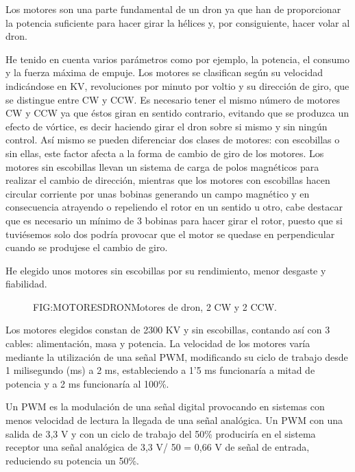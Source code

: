 
Los motores son una parte fundamental de un dron ya que han de proporcionar la potencia suficiente para hacer girar la hélices y, por consiguiente, hacer volar al dron. 
                
 He tenido en cuenta varios parámetros como por ejemplo, la potencia, el consumo y la fuerza máxima de empuje. 
 Los motores se clasifican según su velocidad indicándose en KV, revoluciones por minuto por voltio y su dirección de giro, que se distingue entre CW y CCW. Es necesario tener el mismo número de motores CW y CCW ya que éstos giran en sentido contrario, evitando que se produzca un efecto de vórtice, es decir haciendo girar el dron sobre si mismo y sin ningún control. \linebreak Así mismo se pueden diferenciar dos clases de motores: con escobillas o sin ellas, este factor afecta a la forma de cambio de giro de los motores. Los motores sin escobillas llevan un sistema de carga de polos magnéticos para realizar el cambio de dirección, mientras que los motores con escobillas hacen circular corriente por unas bobinas generando un campo magnético y en consecuencia atrayendo o repeliendo el rotor en un sentido u otro, cabe destacar que es necesario un mínimo de 3 bobinas para hacer girar el rotor, puesto que si tuviésemos solo dos podría provocar que el motor se quedase en perpendicular cuando se produjese el cambio de giro.

 He elegido unos motores sin escobillas por su rendimiento, menor desgaste y fiabilidad. 
 
 \begin{figure}{FIG:MOTORESDRON}{Motores de dron, 2 CW y 2 CCW.}
\end{figure}
                
 Los motores elegidos constan de 2300 KV y sin escobillas, contando así con 3 cables: alimentación, masa y potencia. La velocidad de los motores varía mediante la utilización de una señal PWM, modificando su ciclo de trabajo desde 1 milisegundo (ms) a 2 ms, estableciendo a 1'5 ms funcionaría a mitad de potencia y a 2 ms funcionaría al 100\%.
 
 Un PWM es la modulación de una señal digital provocando en sistemas con menos velocidad de lectura la llegada de una señal analógica. Un PWM con una salida de 3,3 V y con un ciclo de trabajo del 50\% produciría en el sistema receptor una señal analógica de 3,3 V/ 50 = 0,66 V de señal de entrada, reduciendo su potencia un 50\%.